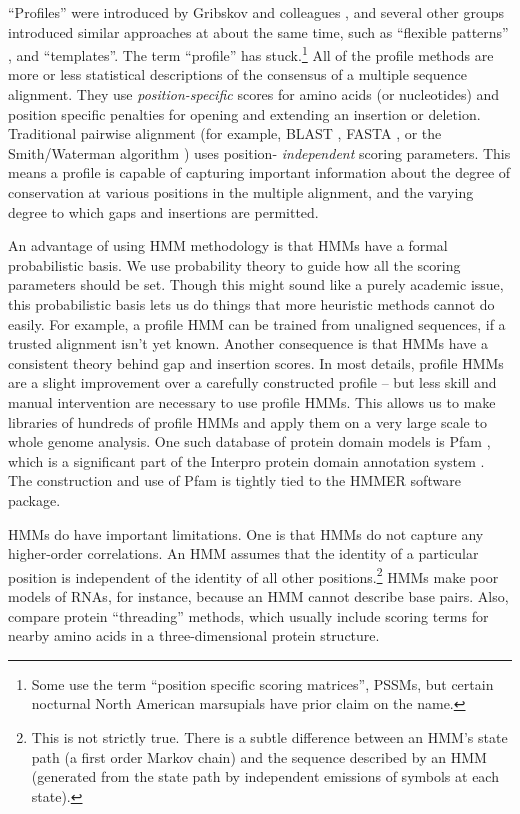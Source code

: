 ``Profiles'' were introduced by Gribskov and colleagues
\cite{Gribskov87,Gribskov90}, and several other groups introduced
similar approaches at about the same time, such as ``flexible
patterns'' \cite{Barton90}, and
``templates''\cite{Bashford87,Taylor86}. The term ``profile'' has
stuck.\footnote{Some use the term ``position specific scoring
matrices'', PSSMs, but certain nocturnal North American marsupials
have prior claim on the name.}  All of the profile methods are more or
less statistical descriptions of the consensus of a multiple sequence
alignment. They use \emph{position-specific} scores for amino acids
(or nucleotides) and position specific penalties for opening and
extending an insertion or deletion.  Traditional pairwise alignment
(for example, BLAST \cite{Altschul90}, FASTA \cite{Pearson88}, or the
Smith/Waterman algorithm \cite{Smith81}) uses position-{\em
independent} scoring parameters. This means a profile is capable of
capturing important information about the degree of conservation at
various positions in the multiple alignment, and the varying degree to
which gaps and insertions are permitted.

An advantage of using HMM methodology is that HMMs have a formal
probabilistic basis. We use probability theory to guide how all the
scoring parameters should be set. Though this might sound like a
purely academic issue, this probabilistic basis lets us do things that
more heuristic methods cannot do easily. For example, a profile HMM
can be trained from unaligned sequences, if a trusted alignment isn't
yet known. Another consequence is that HMMs have a consistent theory
behind gap and insertion scores. In most details, profile HMMs are a
slight improvement over a carefully constructed profile -- but less
skill and manual intervention are necessary to use profile HMMs.  This
allows us to make libraries of hundreds of profile HMMs and apply them
on a very large scale to whole genome analysis.  One such database of
protein domain models is Pfam \cite{Sonnhammer97,Bateman02}, which is
a significant part of the Interpro protein domain annotation system
\cite{Mulder03}. The construction and use of Pfam is tightly tied to
the HMMER software package.

HMMs do have important limitations. One is that HMMs do not capture
any higher-order correlations.  An HMM assumes that the identity of a
particular position is independent of the identity of all other
positions.\footnote{This is not strictly true. There is a subtle
difference between an HMM's state path (a first order Markov chain)
and the sequence described by an HMM (generated from the state path by
independent emissions of symbols at each state).} HMMs make poor
models of RNAs, for instance, because an HMM cannot describe base
pairs. Also, compare protein ``threading'' methods, which usually
include scoring terms for nearby amino acids in a three-dimensional
protein structure.

